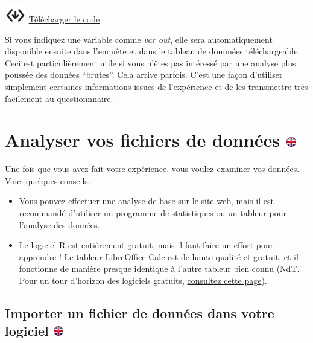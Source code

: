 \documentclass[
]{book}
\begin{document}
\includegraphics{img/codedownload.png} \href{https://www.psytoolkit.org/lessons/speed_measure.zip}{Télécharger le code}

Si vous indiquez une variable comme \emph{var out}, elle sera automatiquement disponible ensuite dans l'enquête et dans le tableau de donnnées téléchargeable. Ceci est particulièrement utile si vous n'êtes pas intéressé par une analyse plus poussée des données ``brutes''. Cela arrive parfois. C'est une façon d'utiliser simplement certaines informations issues de l'expérience et de les transmettre très facilement au questionnnaire.

\hypertarget{analyser-vos-fichiers-de-donnuxe9es}{%
\chapter[Analyser vos fichiers de données ]{\texorpdfstring{Analyser vos fichiers de données \href{https://www.psytoolkit.org/doc3.1.0/analyze_data.html}{\protect\includegraphics{img/ukflag.png}}}{Analyser vos fichiers de données }}\label{analyser-vos-fichiers-de-donnuxe9es}}

Une fois que vous avez fait votre expérience, vous voulez examiner vos données. Voici quelques conseils.

\begin{itemize}
\item
  Vous pouvez effectuer une analyse de base sur le site web, mais il est recommandé d'utiliser un programme de statistiques ou un tableur pour l'analyse des données.
\item
  Le logiciel R est entièrement gratuit, mais il faut faire un effort pour apprendre ! Le tableur LibreOffice Calc est de haute qualité et gratuit, et il fonctionne de manière presque identique à l'autre tableur bien connu (NdT. Pour un tour d'horizon des logiciels gratuits, \href{http://www.ontostats.univ-paris8.fr/omk/s/logicielsStats/page/Typologie}{consultez cette page}).
\end{itemize}

\hypertarget{importer-un-fichier-de-donnuxe9es-dans-votre-logiciel}{%
\section[Importer un fichier de données dans votre logiciel ]{\texorpdfstring{Importer un fichier de données dans votre logiciel \href{https://www.psytoolkit.org/doc3.1.0/analyze_data.html\#_importing_a_data_file_into_your_software}{\protect\includegraphics{img/ukflag.png}}}{Importer un fichier de données dans votre logiciel }}\label{importer-un-fichier-de-donnuxe9es-dans-votre-logiciel}}
\end{document}
